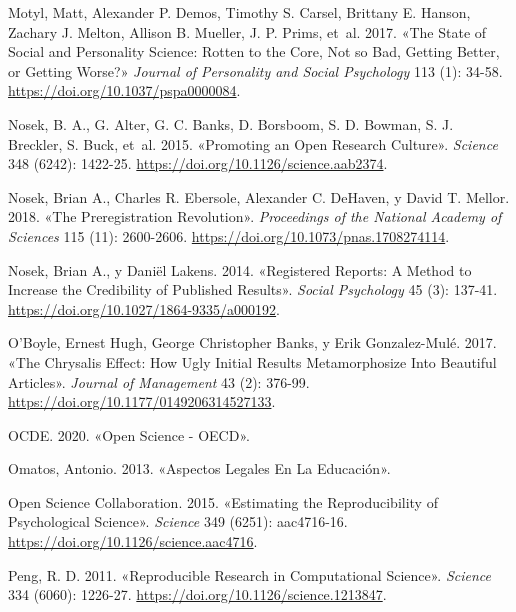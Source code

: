 \documentclass[
  spanish,
  letterpaper,
  DIV=11,
  numbers=noendperiod]{scrreprt}
\newlength{\cslhangindent}
\newenvironment{CSLReferences}[2] %
 {\begin{list}{}{%
  \setlength{\itemindent}{0pt}
  \setlength{\leftmargin}{0pt}
  \setlength{\parsep}{0pt}
  \ifodd #1
   \setlength{\leftmargin}{\cslhangindent}
   \setlength{\itemindent}{-1\cslhangindent}
  \fi
  \setlength{\itemsep}{#2\baselineskip}}}
 {\end{list}}
\begin{document}
\begin{CSLReferences}{1}{0}
Motyl, Matt, Alexander P. Demos, Timothy S. Carsel, Brittany E. Hanson,
Zachary J. Melton, Allison B. Mueller, J. P. Prims, et~al. 2017. {«The
State of Social and Personality Science: {Rotten} to the Core, Not so
Bad, Getting Better, or Getting Worse?»} \emph{Journal of Personality
and Social Psychology} 113 (1): 34-58.
\url{https://doi.org/10.1037/pspa0000084}.

Nosek, B. A., G. Alter, G. C. Banks, D. Borsboom, S. D. Bowman, S. J.
Breckler, S. Buck, et~al. 2015. {«Promoting an Open Research Culture»}.
\emph{Science} 348 (6242): 1422-25.
\url{https://doi.org/10.1126/science.aab2374}.

Nosek, Brian A., Charles R. Ebersole, Alexander C. DeHaven, y David T.
Mellor. 2018. {«The Preregistration Revolution»}. \emph{Proceedings of
the National Academy of Sciences} 115 (11): 2600-2606.
\url{https://doi.org/10.1073/pnas.1708274114}.

Nosek, Brian A., y Daniël Lakens. 2014. {«Registered {Reports}: {A
Method} to {Increase} the {Credibility} of {Published Results}»}.
\emph{Social Psychology} 45 (3): 137-41.
\url{https://doi.org/10.1027/1864-9335/a000192}.

O'Boyle, Ernest Hugh, George Christopher Banks, y Erik Gonzalez-Mulé.
2017. {«The {Chrysalis Effect}: {How Ugly Initial Results Metamorphosize
Into Beautiful Articles}»}. \emph{Journal of Management} 43 (2): 376-99.
\url{https://doi.org/10.1177/0149206314527133}.

OCDE. 2020. {«Open {Science} - {OECD}»}.

Omatos, Antonio. 2013. {«Aspectos {Legales} En La {Educaci{ó}n}»}.

Open Science Collaboration. 2015. {«Estimating the Reproducibility of
Psychological Science»}. \emph{Science} 349 (6251): aac4716-16.
\url{https://doi.org/10.1126/science.aac4716}.

Peng, R. D. 2011. {«Reproducible {Research} in {Computational
Science}»}. \emph{Science} 334 (6060): 1226-27.
\url{https://doi.org/10.1126/science.1213847}.


\end{CSLReferences}
\end{document}
